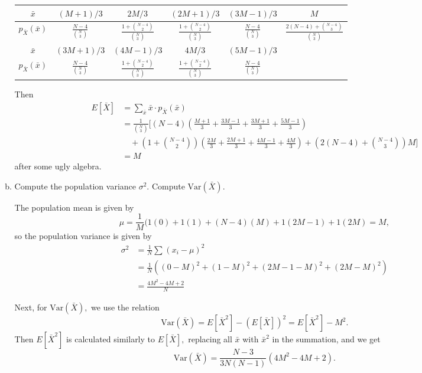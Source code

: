\documentclass{article}
\newcommand{\var}{\mathrm{Var}}
\begin{document}
\begin{enumerate}
\begin{enumerate}[(a)]
\begin{soln}
					\begin{center}
						\begin{tabular}{c||c|c|c|c|c}
							$\bar{x}$ & $(M+1)/3$ & $2M/3$ & $(2M+1)/3$ & $(3M-1)/3$ & $M$ \\
							\hline
							$p_{\bar{X}}(\bar{x})$ & $\displaystyle\frac{N-4}{\binom{N}{3}}$ & $\displaystyle\frac{1+\binom{N-4}{2}}{\binom{N}{3}}$ & $\displaystyle\frac{1+\binom{N-4}{2}}{\binom{N}{3}}$ & $\displaystyle\frac{N-4}{\binom{N}{3}}$ & $\displaystyle\frac{2(N-4)+\binom{N-4}{3}}{\binom{N}{3}}$ \\
							\hline
							$\bar{x}$ & $(3M+1)/3$ & $(4M-1)/3$ & $4M/3$ & $(5M-1)/3$ & \\
							\hline
							$p_{\bar{X}}(\bar{x})$ & $\displaystyle\frac{N-4}{\binom{N}{3}}$ & $\displaystyle\frac{1+\binom{N-4}{2}}{\binom{N}{3}}$ & $\displaystyle\frac{1+\binom{N-4}{2}}{\binom{N}{3}}$ & $\displaystyle\frac{N-4}{\binom{N}{3}}$ & 
						\end{tabular}
					\end{center}
					Then
					\begin{align*}
						E[\bar{X}] &= \sum_{\bar{x}} \bar{x}\cdot p_{\bar{X}} (\bar{x}) \\
						&= \frac{1}{\binom{N}{3}} \Bigg[(N-4)\left( \frac{M+1}{3} + \frac{3M-1}{3} + \frac{3M+1}{3} + \frac{5M-1}{3} \right) \\
						&\quad+\left( 1+\binom{N-4}{2} \right)\left( \frac{2M}{3}+\frac{2M+1}{3}+\frac{4M-1}{3}+\frac{4M}{3} \right) + \left( 2(N-4)+\binom{N-4}{3} \right)M \Bigg] \\
						&= \boxed{M}
					\end{align*} after some ugly algebra.
					
				\end{soln}

			\item Compute the population variance $\sigma^2.$ Compute $\var(\bar{X}).$ 
				\begin{soln}
					The population mean is given by \[\mu=\frac{1}{M}(1(0)+1(1)+(N-4)(M)+1(2M-1)+1(2M) = M, \] so the population variance is given by
					\begin{align*}
						\sigma^2 &= \frac{1}{N}\sum_{}^{}(x_i-\mu)^2 \\
						&= \frac{1}{N}( (0-M)^2+(1-M)^2+(2M-1-M)^2+(2M-M)^2) \\
						&= \boxed{\frac{4M^2-4M+2}{N}}
					\end{align*}

					Next, for $\var(\bar{X}),$ we use the relation \[\var(\bar{X})=E[\bar{X}^2] - (E[\bar{X}])^2 = E[\bar{X}^2]-M^2.\] Then $E[\bar{X}^2]$ is calculated similarly to $E[\bar{X}],$ replacing all $\bar{x}$ with $\bar{x}^2$ in the summation, and we get \[\var(\bar{X})=\boxed{\frac{N-3}{3N(N-1)}(4M^2-4M+2).}\]


\end{soln}
\end{enumerate}
\end{enumerate}
\end{document}
